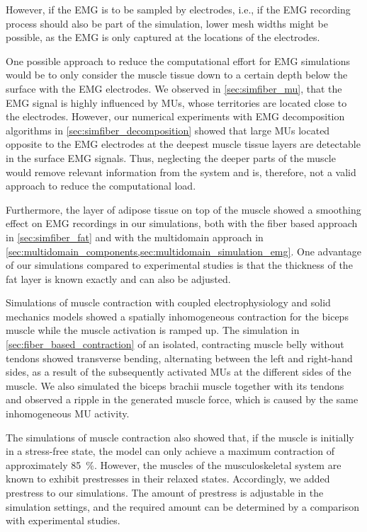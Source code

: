 However, if the EMG is to be sampled by electrodes, i.e., if the EMG recording process should also be part of the simulation, lower mesh widths might be possible, as the EMG is only captured at the locations of the electrodes.

One possible approach to reduce the computational effort for EMG simulations would be to only consider the muscle tissue down to a certain depth below the surface with the EMG electrodes. We observed in \cref{sec:simfiber_mu}, that the EMG signal is highly influenced by MUs, whose territories are located close to the electrodes. However, our numerical experiments with EMG decomposition algorithms in \cref{sec:simfiber_decomposition} showed that large MUs located opposite to the EMG electrodes at the deepest muscle tissue layers are detectable in the surface EMG signals. Thus, neglecting the deeper parts of the muscle would remove relevant information from the system and is, therefore, not a valid approach to reduce the computational load.

Furthermore, the layer of adipose tissue on top of the muscle showed a smoothing effect on EMG recordings in our simulations, both with the fiber based approach in \cref{sec:simfiber_fat} and with the multidomain approach in \cref{sec:multidomain_components,sec:multidomain_simulation_emg}. One advantage of our simulations compared to experimental studies is that the thickness of the fat layer is known exactly and can also be adjusted.

Simulations of muscle contraction with coupled electrophysiology and solid mechanics models showed a spatially inhomogeneous contraction  for the biceps muscle while the muscle activation is ramped up. The simulation in \cref{sec:fiber_based_contraction} of an isolated, contracting muscle belly without tendons showed transverse bending, alternating between the left and right-hand sides, as a result of the subsequently activated MUs at the different sides of the muscle. We also simulated the biceps brachii muscle together with its tendons and observed a ripple in the generated muscle force, which is caused by the same inhomogeneous MU activity.

The simulations of muscle contraction also showed that, if the muscle is initially in a stress-free state, the model can only achieve a maximum contraction of approximately \SI{85}{\percent}. However, the muscles of the musculoskeletal system are known to exhibit prestresses in their relaxed states. Accordingly, we added prestress to our simulations. The amount of prestress is adjustable in the simulation settings, and the required amount can be determined by a comparison with experimental studies.

